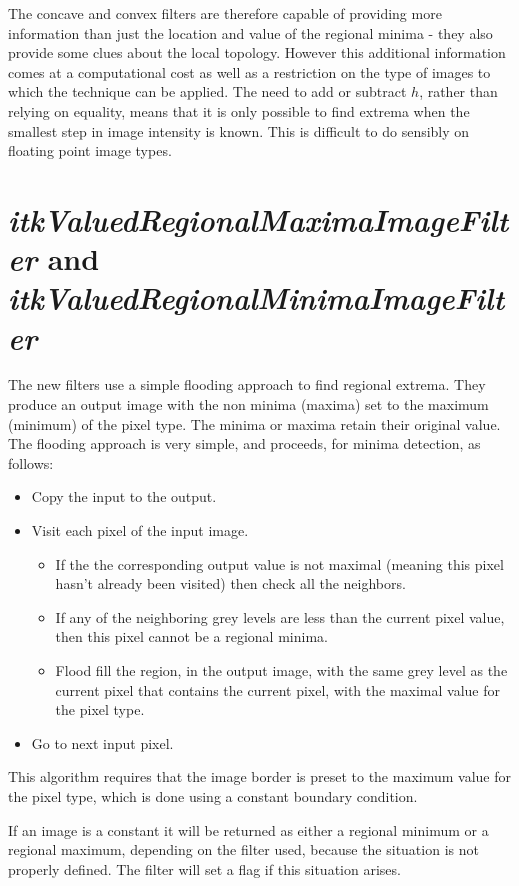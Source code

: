\documentclass{llncs}
\begin{document}
The concave and convex filters are therefore capable of providing more
information than just the location and value of the regional minima -
they also provide some clues about the local topology. However this
additional information comes at a computational cost as well as a
restriction on the type of images to which the technique can be
applied. The need to add or subtract $h$, rather than relying on
equality, means that it is only possible to find extrema when the
smallest step in image intensity is known. This is difficult to do
sensibly on floating point image types.

\section{{\em itkValuedRegionalMaximaImageFilter} and {\em itkValuedRegionalMinimaImageFilter}}
The new filters use a simple flooding approach to find regional
extrema. They produce an output image with the non minima (maxima) set
to the maximum (minimum) of the pixel type. The minima or maxima
retain their original value. 
The flooding approach is very simple, and proceeds, for minima detection, as follows:
\begin{itemize}
\item Copy the input to the output.
\item Visit each pixel of the input image. 
   \begin{itemize}	
   \item If the the corresponding output 
	 value is not maximal (meaning this pixel hasn't already been
      visited) then check all the neighbors. 
    \item If any of the neighboring grey levels are less than the current pixel 
      value, then this pixel cannot be a regional minima.
    \item Flood fill the region, in the output image, with the same grey level 
      as the current pixel that contains the current pixel, with the
      maximal value for the pixel type.
    \end{itemize}
\item Go to next input pixel.
\end{itemize}

This algorithm requires that the image border is preset to the maximum
value for the pixel type, which is done using a constant boundary
condition.

If an image is a constant it will be returned as either a regional
minimum or a regional maximum, depending on the filter used, because
the situation is not properly defined. The filter will set a flag if
this situation arises.
\end{document}
